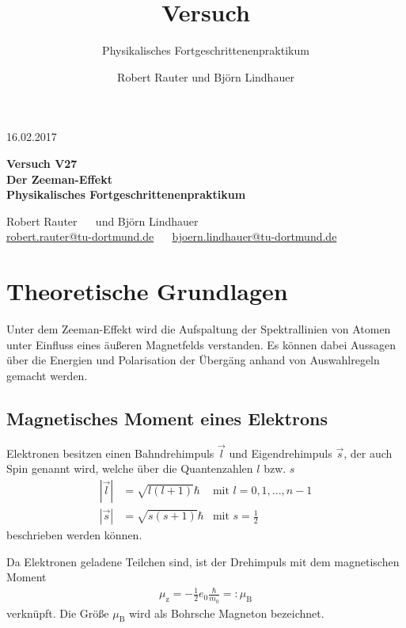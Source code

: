\documentclass[captions=tableheading]{scrartcl}
\title{Versuch \versuchnummer\\ \versuchname}
\subtitle{Physikalisches Fortgeschrittenenpraktikum}
\author{Robert Rauter und Björn Lindhauer}
\date{\versuchdatum}
\newcommand{\versuchnummer}{V27}
\newcommand{\versuchname}{Der Zeeman-Effekt}
\newcommand{\versuchdatum}{16.02.2017}
\newcommand{\indx}[1]{\text{#1}}
\begin{document}
\begin{titlepage}
{\large \versuchdatum}
\vspace{7cm}
\begin{center}
\textbf{\huge Versuch \versuchnummer}\\\vspace{0.5cm}
\textbf{\huge \versuchname}\\
\vspace{0.2cm}
\textbf{Physikalisches Fortgeschrittenenpraktikum}\\
\vspace{9cm}

{\Large Robert Rauter \ \ \hspace{1.5cm} und \hspace{1.5cm} Björn Lindhauer}\\
{ \url{robert.rauter@tu-dortmund.de} \ \ \hspace{2cm} \url{bjoern.lindhauer@tu-dortmund.de}}
\end{center}
\end{titlepage}

\section{Theoretische Grundlagen}
Unter dem Zeeman-Effekt wird die Aufspaltung der Spektrallinien von Atomen unter Einfluss eines äußeren Magnetfelds verstanden. 
Es können dabei Aussagen über die Energien und Polarisation der Übergäng anhand von Auswahlregeln gemacht werden.

\subsection{Magnetisches Moment eines Elektrons}
Elektronen besitzen einen Bahndrehimpuls $\vec{l}$ und Eigendrehimpuls $\vec{s}$, der auch Spin genannt wird, welche über die Quantenzahlen $l$ bzw. $s$
\begin{align}
\left| \vec{l} \right| &= \sqrt{l\left(l+1\right)}\hbar &  \text{mit } l=0,1,...,n-1\\
\left| \vec{s} \right| &= \sqrt{s\left(s+1\right)}\hbar &  \text{mit }  s=\frac{1}{2}
\end{align}
beschrieben werden können.

Da Elektronen geladene Teilchen sind, ist der Drehimpuls mit dem magnetischen Moment 
\begin{align}
\mu_\indx{z}=-\frac{1}{2}e_\indx{0} \frac{\hbar}{m_0}=:\mu_\indx{B}
\end{align}
verknüpft. 
Die Größe $\mu_\indx{B}$ wird als Bohrsche Magneton bezeichnet.
\end{document}
